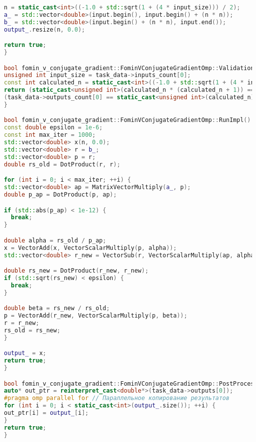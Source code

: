 \documentclass[12pt]{article}
\begin{document}
\begin{lstlisting}[language=C++]
n = static_cast<int>((-1.0 + std::sqrt(1 + (4 * input_size))) / 2);
a_ = std::vector<double>(input.begin(), input.begin() + (n * n));
b_ = std::vector<double>(input.begin() + (n * n), input.end());
output_.resize(n, 0.0);

return true;
}

bool fomin_v_conjugate_gradient::FominVConjugateGradientOmp::ValidationImpl() {
unsigned int input_size = task_data->inputs_count[0];
const int calculated_n = static_cast<int>((-1.0 + std::sqrt(1 + (4 * input_size))) / 2);
return (static_cast<unsigned int>(calculated_n * (calculated_n + 1)) == input_size) &&
(task_data->outputs_count[0] == static_cast<unsigned int>(calculated_n));
}

bool fomin_v_conjugate_gradient::FominVConjugateGradientOmp::RunImpl() {
const double epsilon = 1e-6;
const int max_iter = 1000;
std::vector<double> x(n, 0.0);
std::vector<double> r = b_;
std::vector<double> p = r;
double rs_old = DotProduct(r, r);

for (int i = 0; i < max_iter; ++i) {
std::vector<double> ap = MatrixVectorMultiply(a_, p);
double p_ap = DotProduct(p, ap);

if (std::abs(p_ap) < 1e-12) {
  break;
}

double alpha = rs_old / p_ap;
x = VectorAdd(x, VectorScalarMultiply(p, alpha));
std::vector<double> r_new = VectorSub(r, VectorScalarMultiply(ap, alpha));

double rs_new = DotProduct(r_new, r_new);
if (std::sqrt(rs_new) < epsilon) {
  break;
}

double beta = rs_new / rs_old;
p = VectorAdd(r_new, VectorScalarMultiply(p, beta));
r = r_new;
rs_old = rs_new;
}

output_ = x;
return true;
}

bool fomin_v_conjugate_gradient::FominVConjugateGradientOmp::PostProcessingImpl() {
auto* out_ptr = reinterpret_cast<double*>(task_data->outputs[0]);
#pragma omp parallel for // Параллельное копирование результатов
for (int i = 0; i < static_cast<int>(output_.size()); ++i) {
out_ptr[i] = output_[i];
}
return true;
}
\end{lstlisting}
\newpage
\begin{lstlisting}[language=C++]

\end{lstlisting}
\end{document}
